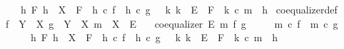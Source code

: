 \begin{isabellebody}
\ \ \ \ {\isasymand}\ {\isacharparenleft}{\kern0pt}{\isasymforall}\ h\ F{\isachardot}{\kern0pt}\ {\isacharparenleft}{\kern0pt}{\isacharparenleft}{\kern0pt}h\ {\isacharcolon}{\kern0pt}\ X\ {\isasymrightarrow}\ F{\isacharparenright}{\kern0pt}\ {\isasymand}\ {\isacharparenleft}{\kern0pt}h\ {\isasymcirc}\isactrlsub c\ f\ {\isacharequal}{\kern0pt}\ h\ {\isasymcirc}\isactrlsub c\ g{\isacharparenright}{\kern0pt}{\isacharparenright}{\kern0pt}\ {\isasymlongrightarrow}\ {\isacharparenleft}{\kern0pt}{\isasymexists}{\isacharbang}{\kern0pt}\ k{\isachardot}{\kern0pt}\ {\isacharparenleft}{\kern0pt}k\ {\isacharcolon}{\kern0pt}\ E\ {\isasymrightarrow}\ F{\isacharparenright}{\kern0pt}\ {\isasymand}\ k\ {\isasymcirc}\isactrlsub c\ m\ {\isacharequal}{\kern0pt}\ h{\isacharparenright}{\kern0pt}{\isacharparenright}{\kern0pt}{\isacharparenright}{\kern0pt}{\isachardoublequoteclose}\isanewline
\isanewline
{}\isamarkupfalse%
\ coequalizer{\isacharunderscore}{\kern0pt}def{}{\isacharcolon}{\kern0pt}\isanewline
\ \ \ {\isachardoublequoteopen}f\ {\isacharcolon}{\kern0pt}\ Y\ {\isasymrightarrow}\ X{\isachardoublequoteclose}\ {\isachardoublequoteopen}g\ {\isacharcolon}{\kern0pt}\ Y\ {\isasymrightarrow}\ X{\isachardoublequoteclose}\ {\isachardoublequoteopen}m\ {\isacharcolon}{\kern0pt}\ X\ {\isasymrightarrow}\ E{\isachardoublequoteclose}\isanewline
\ \ \ {\isachardoublequoteopen}coequalizer\ E\ m\ f\ g\ {\isasymlongleftrightarrow}\isanewline
\ \ \ \ {\isacharparenleft}{\kern0pt}m\ {\isasymcirc}\isactrlsub c\ f\ {\isacharequal}{\kern0pt}\ m\ {\isasymcirc}\isactrlsub c\ g{\isacharparenright}{\kern0pt}\isanewline
\ \ \ \ \ \ {\isasymand}\ {\isacharparenleft}{\kern0pt}{\isasymforall}\ h\ F{\isachardot}{\kern0pt}\ {\isacharparenleft}{\kern0pt}{\isacharparenleft}{\kern0pt}h\ {\isacharcolon}{\kern0pt}\ X\ {\isasymrightarrow}\ F{\isacharparenright}{\kern0pt}\ {\isasymand}\ {\isacharparenleft}{\kern0pt}h\ {\isasymcirc}\isactrlsub c\ f\ {\isacharequal}{\kern0pt}\ h\ {\isasymcirc}\isactrlsub c\ g{\isacharparenright}{\kern0pt}{\isacharparenright}{\kern0pt}\ {\isasymlongrightarrow}\ {\isacharparenleft}{\kern0pt}{\isasymexists}{\isacharbang}{\kern0pt}\ k{\isachardot}{\kern0pt}\ {\isacharparenleft}{\kern0pt}k\ {\isacharcolon}{\kern0pt}\ E\ {\isasymrightarrow}\ F{\isacharparenright}{\kern0pt}\ {\isasymand}\ k\ {\isasymcirc}\isactrlsub c\ m\ {\isacharequal}{\kern0pt}\ h{\isacharparenright}{\kern0pt}{\isacharparenright}{\kern0pt}{\isachardoublequoteclose}\isanewline
%
\isadelimproof
\ \ %
\endisadelimproof
%
\isatagproof
{}\isamarkupfalse%

\end{isabellebody}
